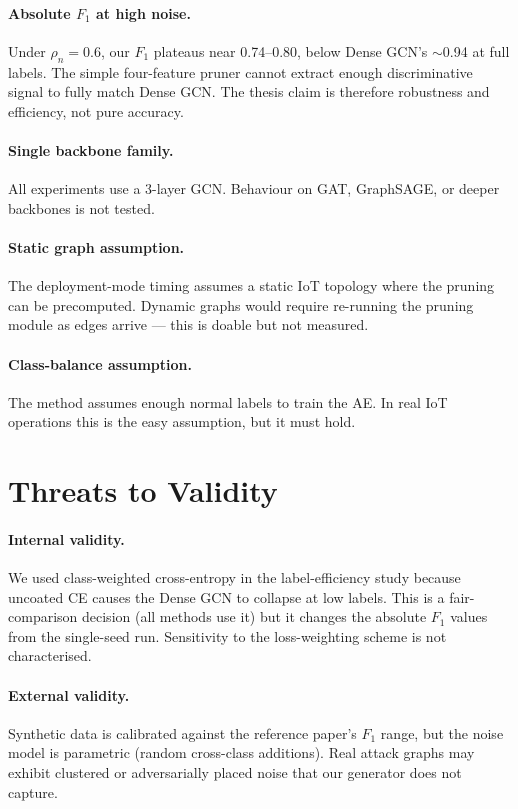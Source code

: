 \documentclass[11pt,a4paper]{report}
\theoremstyle{definition}
\theoremstyle{remark}
\begin{document}
\paragraph{Absolute $F_1$ at high noise.}
Under $\rho_n=0.6$, our $F_1$ plateaus near 0.74--0.80, below Dense
GCN's $\sim$0.94 at full labels. The simple four-feature pruner cannot
extract enough discriminative signal to fully match Dense GCN. The
thesis claim is therefore robustness and efficiency, not pure accuracy.

\paragraph{Single backbone family.}
All experiments use a 3-layer GCN. Behaviour on GAT, GraphSAGE, or
deeper backbones is not tested.

\paragraph{Static graph assumption.}
The deployment-mode timing assumes a static IoT topology where the
pruning can be precomputed. Dynamic graphs would require re-running the
pruning module as edges arrive --- this is doable but not measured.

\paragraph{Class-balance assumption.}
The method assumes enough normal labels to train the AE. In real IoT
operations this is the easy assumption, but it must hold.

\section{Threats to Validity}

\paragraph{Internal validity.}
We used class-weighted cross-entropy in the label-efficiency study
because uncoated CE causes the Dense GCN to collapse at low labels.
This is a fair-comparison decision (all methods use it) but it changes
the absolute $F_1$ values from the single-seed run. Sensitivity to the
loss-weighting scheme is not characterised.

\paragraph{External validity.}
Synthetic data is calibrated against the reference paper's $F_1$ range,
but the noise model is parametric (random cross-class additions). Real
attack graphs may exhibit clustered or adversarially placed noise that
our generator does not capture.
\end{document}
